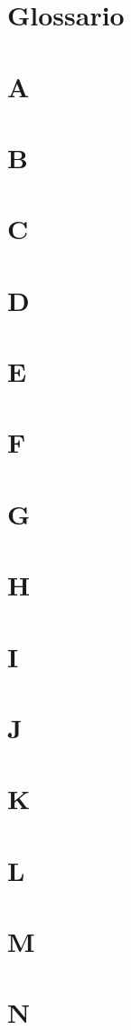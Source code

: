 \appendix
\section{Glossario}
\section*{A}
\section*{B}
\section*{C}
\section*{D}
\section*{E}
\section*{F}
\section*{G}
\section*{H}
\section*{I}
\section*{J}
\section*{K}
\section*{L}
\section*{M}
\section*{N}
